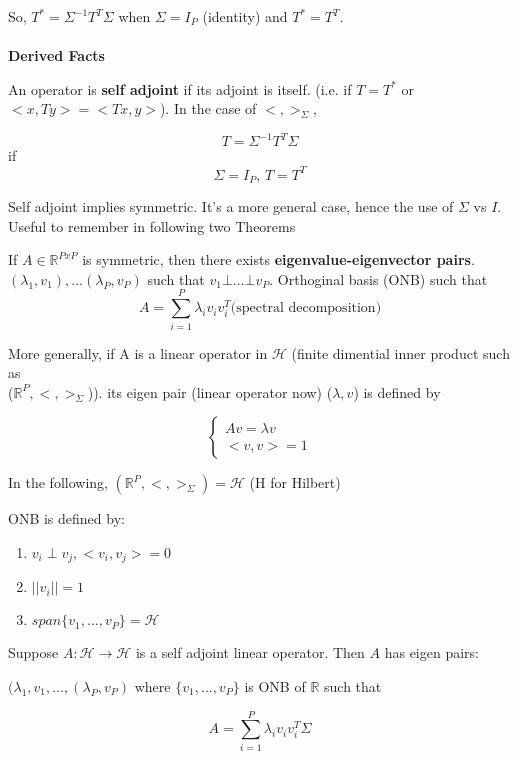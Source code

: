 \documentclass[11pt,fleqn]{book} %
\begin{document}
So, $T^* = \Sigma^{-1} T^T \Sigma$ when $\Sigma = I_P$ (identity) 
and $T^* = T^T$. \\
\\
\textbf{Derived Facts}

An operator is \textbf{self adjoint} if its adjoint is itself. (i.e. if $T = T^*$ or $<x, Ty> = <Tx, y>$). In the case of $<,>_\Sigma$, 

$$T = \Sigma^{-1} T^T \Sigma$$
 if 
$$ \Sigma = I_P\text{, }T = T^T$$ 

\begin{remark}
	Self adjoint implies symmetric. It's a more general case, hence the use of $\Sigma$ vs $I$. Useful to remember in following two Theorems
\end{remark}

\begin{theorem}
	If $A \in \mathbb{R}^{PxP}$ is symmetric, then there exists \textbf{eigenvalue-eigenvector pairs}.\\
	 $(\lambda_1, v_1), \dots (\lambda_P, v_P)$ such that $v_1 \bot \dots \bot v_P$. Orthoginal basis (ONB) such that $$A = \displaystyle \sum^P_{i=1} \lambda_i v_i v_i^T \text{(spectral decomposition)}$$ 
\end{theorem}
 
 More generally, if A is a linear operator in $\mathscr{H}$ (finite dimential inner product such as \\ ($\mathbb{R}^P, <,>_\Sigma$)). its eigen pair (linear operator now) ($\lambda, v$) is defined by 

$$\begin{cases}
 Av = \lambda v\\
 <v,v> = 1
 \end{cases}$$

\begin{definition}
In the following, $(\mathbb{R}^P, <,>_\Sigma) = \mathscr{H}$ (H for Hilbert)

ONB is defined by:	

	\begin{enumerate}
		\item $v_i \perp v_j, <v_i, v_j> = 0$ 
		\item $||v_i || = 1$
		\item $span\{v_1, \dots, v_P \} = \mathscr{H}$
	\end{enumerate}
\end{definition}



\begin{theorem}
	Suppose $A: \mathscr{H} \rightarrow \mathscr{H}$ is a self adjoint linear operator. Then $A$ has eigen pairs:

	$(\lambda_1, v_1, \dots, (\lambda_P, v_P)$ where $\{v_1, \dots, v_P \}$ is ONB of $\mathbb{R}$ such that

	$$A = \displaystyle \sum^P_{i=1} \lambda_i v_i v_i^T \Sigma$$



\end{theorem}
\end{document}
